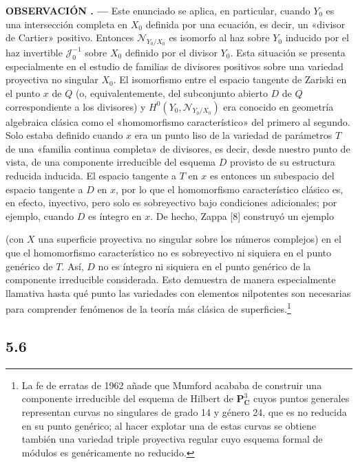 \documentclass[11pt,twoside,openany]{book}
\numberwithin{equation}{section}
\newcommand{\src}[1]{%
  \phantomsection\hypertarget{src:#1}{}%
  \marginpar{\raggedleft\footnotesize\sffamily #1}%
}
\theoremstyle{plain}
\theoremstyle{definition}
\theoremstyle{remark}
\newcommand{\result}[2]{%
  \par\medskip\noindent\textbf{#1%
  \if\relax\detokenize{#2}\relax\else\space#2\fi. ---}\enspace
}
\newcommand{\FgaUnitKey}{frontmatter}
\renewcommand{\src}[1]{%
  \phantomsection\hypertarget{src:\FgaUnitKey:#1}{}%
  \marginpar{\raggedleft\footnotesize\sffamily #1}%
}
\theoremstyle{plain}
\theoremstyle{definition}
\theoremstyle{remark}
\begin{document}
\result{OBSERVACIÓN}{5.5} Este enunciado se aplica, en particular, cuando
$Y_0$ es una intersección completa en $X_0$ definida por una ecuación, es
decir, un «divisor de Cartier» positivo. Entonces $\mathcal N_{Y_0/X_0}$ es
isomorfo al haz sobre $Y_0$ inducido por el haz invertible
$\mathcal J_0^{-1}$ sobre $X_0$ definido por el divisor $Y_0$. Esta situación
se presenta especialmente en el estudio de familias de divisores positivos
sobre una variedad proyectiva no singular $X_0$. El isomorfismo entre el
espacio tangente de Zariski en el punto $x$ de $Q$ (o, equivalentemente, del
subconjunto abierto $D$ de $Q$ correspondiente a los divisores) y
$H^0(Y_0,\mathcal N_{Y_0/X_0})$ era conocido en geometría algebraica clásica
como el «homomorfismo característico» del primero al segundo. Solo estaba
definido cuando $x$ era un punto liso de la variedad de parámetros $T$ de una
«familia continua completa» de divisores, es decir, desde nuestro punto de
vista, de una componente irreducible del esquema $D$ provisto de su estructura
reducida inducida. El
espacio tangente a $T$ en $x$ es entonces un subespacio del espacio tangente a
$D$ en $x$, por lo que el homomorfismo característico clásico es, en efecto,
inyectivo, pero solo es sobreyectivo bajo condiciones adicionales; por ejemplo,
cuando $D$ es íntegro en $x$. De hecho, Zappa [8] construyó un ejemplo
\src{272}
(con $X$ una superficie proyectiva no singular sobre los números complejos) en
el que el homomorfismo característico no es sobreyectivo ni siquiera en el
punto genérico de $T$. Así, $D$ no es íntegro ni siquiera en el punto genérico
de la componente irreducible considerada. Esto demuestra de manera
especialmente llamativa hasta qué punto las variedades con elementos
nilpotentes son necesarias para comprender fenómenos de la teoría más clásica
de superficies.\footnote{La fe de erratas de 1962 añade que Mumford acababa de
construir una componente irreducible del esquema de Hilbert de
$\mathbf P^3_{\mathbf C}$ cuyos puntos generales representan curvas no
singulares de grado 14 y género 24, que es no reducida en su punto genérico;
al hacer explotar una de estas curvas se obtiene también una variedad triple
proyectiva regular cuyo esquema formal de módulos es genéricamente no
reducido.}

\subsection*{5.6}
\end{document}
